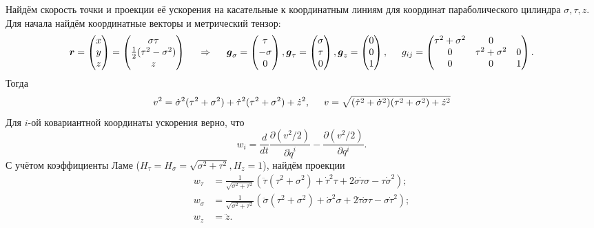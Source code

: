 Найдём скорость точки и проекции её ускорения на касательные к координатным линиям для координат параболического цилиндра $\sigma, \tau, z$. Для начала найдём координатные векторы и метрический тензор:
$$
    \mbox{\boldmath $r$} = \begin{pmatrix}
        x \\ y \\ z
    \end{pmatrix} = \begin{pmatrix}
        \sigma \tau \\ \frac{1}{2} (\tau^2 - \sigma^2) \\ z
    \end{pmatrix}
    \hspace{0.5cm} \Rightarrow \hspace{0.5cm} 
        \mbox{\boldmath $g$}_\sigma = \begin{pmatrix}
        \tau \\ - \sigma \\ 0 
    \end{pmatrix},
    \mbox{\boldmath $g$}_\tau = \begin{pmatrix}
        \sigma \\ \tau \\ 0
    \end{pmatrix},
    \mbox{\boldmath $g$}_z = \begin{pmatrix}
        0 \\ 0 \\ 1
    \end{pmatrix}, \hspace{0.5cm} 
    g_{ij} = \begin{pmatrix}
        \tau^2 + \sigma^2 & 0 & \\
        0 & \tau^2 + \sigma^2 & 0 \\
        0 & 0 & 1
    \end{pmatrix}.
$$
Тогда
$$
    v^2 = \dot{\sigma}^2 (\tau^2 + \sigma^2) + \dot{\tau}^2 (\tau^2 + \sigma^2) + \dot{z}^2,
    \hspace{0.5cm} 
    v =  \sqrt{(\dot{\tau}^2 + \dot{\sigma}^2)(\tau^2 + \sigma^2) + \dot{z}^2}
$$
Для $i$-ой ковариантной координаты ускорения верно, что
\begin{equation}
    w_i = \frac{d}{dt} \frac{\partial (v^2/2)}{\partial \dot{q}^i} - \frac{\partial (v^2/2)}{\partial q^i}.
\end{equation}
С учётом коэффициенты Ламе ($H_\tau = H_\sigma=\sqrt{\sigma^2+\tau^2}, H_z = 1$), найдём проекции
\begin{align*}
    w_\tau &= \frac{1}{\sqrt{\sigma^2+\tau^2}} \left(
        \ddot{\tau} (\tau^2 + \sigma^2) + \dot{\tau}^2 \tau  + 2 \dot{\sigma} \dot{\tau} \sigma - \tau \dot{\sigma}^2
    \right); \\
    w_\sigma &= \frac{1}{\sqrt{\sigma^2+\tau^2}} \left(
        \ddot{\sigma} (\tau^2 + \sigma^2) + \dot{\sigma}^2 \sigma  + 2 \dot{\tau} \dot{\sigma} \tau - \sigma \dot{\tau}^2\right); \\
    w_z &= \ddot{z}.
\end{align*}


